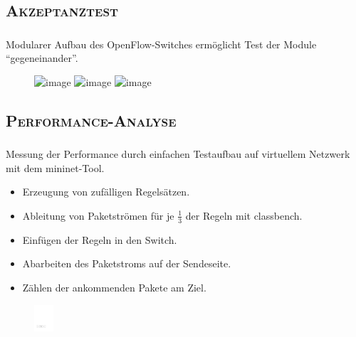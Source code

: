 \documentclass[xcolor=x11names,compress]{beamer}
\renewcommand{\(}{\begin{columns}}
\renewcommand{\)}{\end{columns}}
\newcommand{\<}[1]{\begin{column}{#1}}
\renewcommand{\>}{\end{column}}
\begin{document}
\subsection{\scshape Akzeptanztest}
\begin{frame}
  \frametitle{\insertsubsection}
  Modularer Aufbau des OpenFlow-Switches ermöglicht Test der Module \enquote{gegeneinander}.
  \begin{figure}
  \centering
  \includegraphics<1>[height=6cm]{figures/acctest-L1}
  \includegraphics<2>[height=6cm]{figures/acctest-L1-2}
  \includegraphics<3>[height=6cm]{figures/acctest-L1-3}
  \end{figure}
\end{frame}

\subsection{\scshape Performance-Analyse}
\begin{frame}
  \frametitle{\insertsubsection}
  Messung der Performance durch einfachen Testaufbau auf virtuellem Netzwerk mit dem \textsf{mininet}-Tool.
  \begin{itemize}
    \item Erzeugung von zufälligen Regelsätzen.
    \item Ableitung von Paketströmen für je $\frac{1}{3}$ der Regeln mit \textsf{classbench}.
    \item Einfügen der Regeln in den Switch.
    \item Abarbeiten des Paketstroms auf der Sendeseite.
    \item Zählen der ankommenden Pakete am Ziel.
  \end{itemize}
  \begin{figure}
  \centering
  \includegraphics[height=1cm]{figures/ofswitch-perftest}
  \end{figure}
\end{frame}
\end{document}
